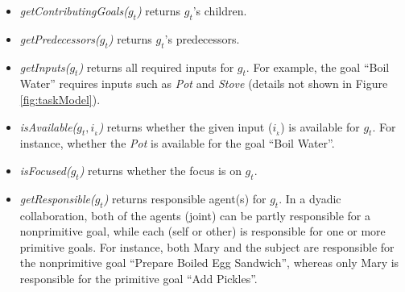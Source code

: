 \documentclass{sig-alternate-05-2015}
\begin{document}
\begin{itemize}[leftmargin=2pt]
  
  
  

  \item \textit{getContributingGoals($g_t$)} returns $g_t$'s children.
    
  \item \textit{getPredecessors($g_t$)} returns $g_t$'s predecessors.
  
  \item \textit{getInputs($g_t$)} returns all required inputs for $g_t$. For
  example, the goal ``Boil Water'' requires inputs such as \textit{Pot} and
  \textit{Stove} (details not shown in Figure \ref{fig:taskModel}).
  
  \item \textit{isAvailable($g_t, i_{_k}$)} returns whether the given input
  ($i_{_k}$) is available for $g_t$. For instance, whether the \textit{Pot} is
  available for the goal ``Boil Water''.
  
  
  \item \textit{isFocused($g_t$)} returns whether the focus is on $g_t$.
  
  \item \textit{getResponsible($g_t$)} returns responsible agent(s) for $g_t$.
  In a dyadic collaboration, both of the agents (joint) can be partly responsible
  for a nonprimitive goal, while each (self or other) is responsible for one or
  more primitive goals. For instance, both Mary and the subject are responsible
  for the nonprimitive goal ``Prepare Boiled Egg Sandwich'', whereas only Mary
  is responsible for the primitive goal ``Add Pickles''.
\end{itemize}
\end{document}
